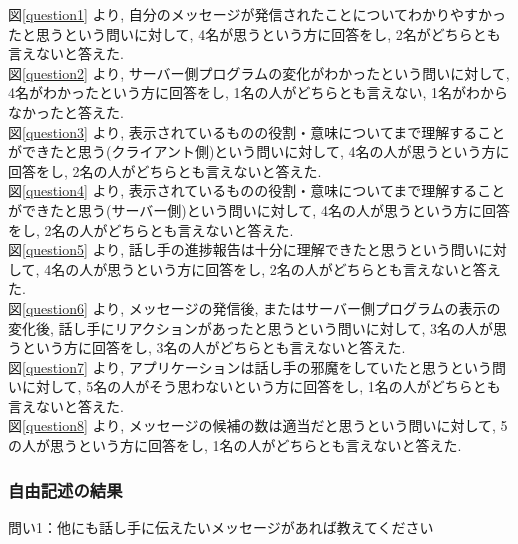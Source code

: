 \documentclass{funthesis}
\begin{document}
図\ref{question1} より, 自分のメッセージが発信されたことについてわかりやすかったと思うという問いに対して, 4名が思うという方に回答をし, 2名がどちらとも言えないと答えた. \\

図\ref{question2} より, サーバー側プログラムの変化がわかったという問いに対して, 4名がわかったという方に回答をし, 1名の人がどちらとも言えない, 1名がわからなかったと答えた.\\ 

図\ref{question3} より, 表示されているものの役割・意味についてまで理解することができたと思う(クライアント側)という問いに対して, 4名の人が思うという方に回答をし, 2名の人がどちらとも言えないと答えた. \\

図\ref{question4} より, 表示されているものの役割・意味についてまで理解することができたと思う(サーバー側)という問いに対して, 4名の人が思うという方に回答をし, 2名の人がどちらとも言えないと答えた. \\

図\ref{question5} より, 話し手の進捗報告は十分に理解できたと思うという問いに対して, 4名の人が思うという方に回答をし, 2名の人がどちらとも言えないと答えた. \\

図\ref{question6} より, メッセージの発信後, またはサーバー側プログラムの表示の変化後, 話し手にリアクションがあったと思うという問いに対して, 3名の人が思うという方に回答をし, 3名の人がどちらとも言えないと答えた. \\

図\ref{question7} より, アプリケーションは話し手の邪魔をしていたと思うという問いに対して, 5名の人がそう思わないという方に回答をし, 1名の人がどちらとも言えないと答えた. \\

図\ref{question8} より, メッセージの候補の数は適当だと思うという問いに対して, 5の人が思うという方に回答をし, 1名の人がどちらとも言えないと答えた. \\

\subsubsection{自由記述の結果}

問い1：他にも話し手に伝えたいメッセージがあれば教えてください\\
\end{document}
